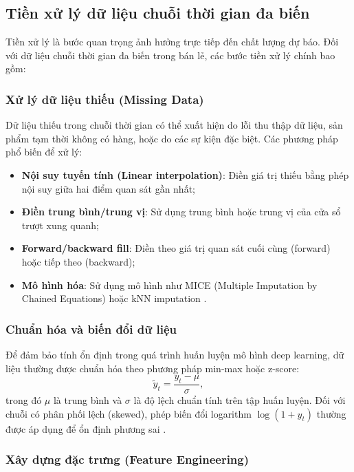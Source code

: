 \subsection{Tiền xử lý dữ liệu chuỗi thời gian đa biến}
\label{subsec:tien_xu_ly}

Tiền xử lý là bước quan trọng ảnh hưởng trực tiếp đến chất lượng dự báo. Đối với dữ liệu chuỗi thời gian đa biến trong bán lẻ, các bước tiền xử lý chính bao gồm:

\subsubsection{Xử lý dữ liệu thiếu (Missing Data)}

Dữ liệu thiếu trong chuỗi thời gian có thể xuất hiện do lỗi thu thập dữ liệu, sản phẩm tạm thời không có hàng, hoặc do các sự kiện đặc biệt. Các phương pháp phổ biến để xử lý:
\begin{itemize}
    \item \textbf{Nội suy tuyến tính (Linear interpolation)}: Điền giá trị thiếu bằng phép nội suy giữa hai điểm quan sát gần nhất;
    \item \textbf{Điền trung bình/trung vị}: Sử dụng trung bình hoặc trung vị của cửa sổ trượt xung quanh;
    \item \textbf{Forward/backward fill}: Điền theo giá trị quan sát cuối cùng (forward) hoặc tiếp theo (backward);
    \item \textbf{Mô hình hóa}: Sử dụng mô hình như MICE (Multiple Imputation by Chained Equations) hoặc kNN imputation \citep{buuren2011mice}.
\end{itemize}

\subsubsection{Chuẩn hóa và biến đổi dữ liệu}

Để đảm bảo tính ổn định trong quá trình huấn luyện mô hình deep learning, dữ liệu thường được chuẩn hóa theo phương pháp min-max hoặc z-score:
\begin{equation}
    \tilde{y}_t = \frac{y_t - \mu}{\sigma},
    \label{eq:chuan_hoa}
\end{equation}
trong đó $\mu$ là trung bình và $\sigma$ là độ lệch chuẩn tính trên tập huấn luyện. Đối với chuỗi có phân phối lệch (skewed), phép biến đổi logarithm $\log(1 + y_t)$ thường được áp dụng để ổn định phương sai \citep{box1964analysis}.

\subsubsection{Xây dựng đặc trưng (Feature Engineering)}

